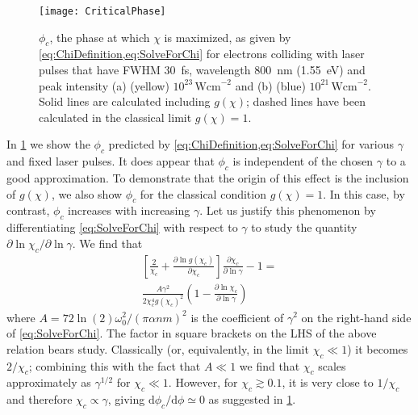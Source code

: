 \documentclass[reprint,superscriptaddress,amsmath,amssymb,aps,pra]{revtex4-1}
\newcommand{\Wcm}{\mathrm{Wcm}}
\newcommand{\lnTwo}{\ln(2)}
\begin{document}
	\begin{figure}
	\texttt{[image: CriticalPhase]}
	\caption[Critical phase]
		{$\phi_c$, the phase at which $\chi$ is maximized,
		as given by \cref{eq:ChiDefinition,eq:SolveForChi}
		for electrons colliding with laser pulses that have
		FWHM 30~fs, wavelength 800~nm (1.55~eV) and peak intensity
		(a) (yellow) $10^{23}\,\Wcm^{-2}$ and (b) (blue) $10^{21}\,\Wcm^{-2}$.
		Solid lines are calculated including $g(\chi)$; dashed
		lines have been calculated in the classical limit
		$g(\chi) = 1$.}
	\label{fig:CriticalPhase}
	\end{figure}

In \cref{fig:CriticalPhase} we show the $\phi_c$ predicted by
\cref{eq:ChiDefinition,eq:SolveForChi} for various $\gamma$ and fixed
laser pulses. It does appear that $\phi_c$ is independent of the
chosen $\gamma$ to a good approximation. To demonstrate that the origin of this effect is the
inclusion of $g(\chi)$, we also show $\phi_c$ for the classical condition
$g(\chi) = 1$. In this case, by contrast, $\phi_c$ increases with
increasing $\gamma$. Let us justify this phenomenon by differentiating
\cref{eq:SolveForChi} with respect to $\gamma$ to study the quantity
$\partial \ln \chi_c/\partial \ln \gamma$. We find that
	\begin{multline}
	\left[ \frac{2}{\chi_c} + \frac{\partial\ln g(\chi_c)}{\partial\chi_c} \right]
	\frac{\partial \chi_c}{\partial \ln \gamma} - 1
	= \\
		\frac{A \gamma^2}{2 \chi_c^4 g(\chi_c)^2}
		\left( 1 -
			\frac{\partial \ln \chi_c}{\partial \ln \gamma}
		\right)
	\label{eq:ChiGammaScaling}
	\end{multline}
where $A = 72\lnTwo \omega_0^2 / (\pi \alpha n m)^2$ is the coefficient of $\gamma^2$ on the right-hand side
of \cref{eq:SolveForChi}. The factor in square brackets on the LHS
of the above relation bears study. Classically (or, equivalently, in
the limit $\chi_c \ll 1$) it becomes $2/\chi_c$; combining this with the
fact that $A \ll 1$ we find that $\chi_c$ scales approximately
as $\gamma^{1/2}$ for $\chi_c\ll 1$.
However, for $\chi_c \gtrsim 0.1$, it is very close to $1/\chi_c$
and therefore $\chi_c \propto \gamma$, giving $\mathrm{d}\phi_c/\mathrm{d}\phi \simeq 0$
as suggested in \cref{fig:CriticalPhase}.
\end{document}
